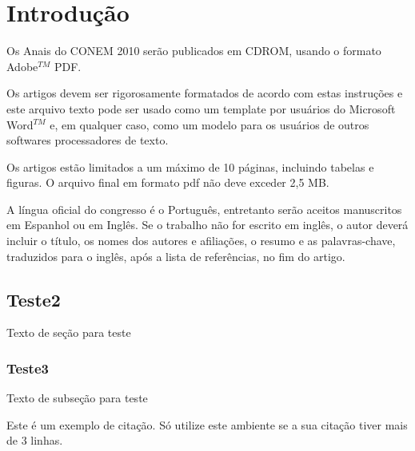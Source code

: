 \documentclass{ufscThesis}
\begin{document}
\capa  
\folhaderosto[comficha] %
\folhaaprovacao
\paginadedicatoria
\paginaagradecimento
\paginaepigrafe
\paginaresumo
\paginaabstract
\listadefiguras
\listadetabelas 
\listadeabreviaturas
\listadesimbolos
\sumario



\chapter{Introdução}
Os Anais do CONEM 2010 serão publicados em CDROM, usando o formato Adobe$^{TM}$ PDF.

Os artigos devem ser rigorosamente formatados de acordo com estas instruções e este arquivo texto pode ser usado como um template por usuários do Microsoft Word$^{TM}$ e, em qualquer caso, como um modelo para os usuários de outros softwares processadores de texto.

Os artigos estão limitados a um máximo de 10 páginas, incluindo tabelas e figuras. O arquivo final em formato pdf não deve exceder 2,5 MB.

A língua oficial do congresso é o Português, entretanto serão aceitos manuscritos em Espanhol ou em Inglês. Se o trabalho não for escrito em inglês, o autor deverá incluir o título, os nomes dos autores e afiliações, o resumo e as palavras-chave, traduzidos para o inglês, após a lista de referências, no fim do artigo.

\section{Teste2}
Texto de seção para teste

\subsection{Teste3}
Texto de subseção para teste
\begin{citacao}
 Este é um exemplo de citação. Só utilize este ambiente se
 a sua citação tiver mais de 3 linhas.
\end{citacao}
\end{document}
